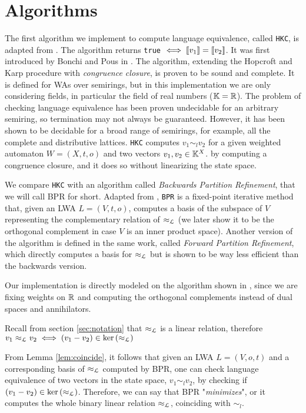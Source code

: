 \section{Algorithms}
The first algorithm we implement to compute language equivalence, called \texttt{HKC},
is adapted from \cite{DBLP:journals/corr/Bonchi0K17}. 
The algorithm returns \texttt{true} $\iff \llbracket v_1\rrbracket = \llbracket v_2\rrbracket$.
It was first introduced by 
Bonchi and Pous in \cite{bonchi2013checking}.
The algorithm, extending the Hopcroft and Karp procedure 
\cite{hopcroft1971linear} with \textit{congruence closure}, is 
proven to be sound and complete.
It is defined for 
WAs over semirings, but in this implementation we are only 
considering fields, in particular 
the field of real numbers ($\mathbb{K} = \mathbb{R}$).
The problem of checking language equivalence 
has been proven undecidable for an arbitrary semiring, so termination 
may not always be guaranteed. However, it has been shown to be decidable
for a broad range of semirings, for example, all the complete and
distributive lattices.
\texttt{HKC} computes $v_1 \sim_l v_2$ for a given weighted automaton
$W = (X, t, o)$ and two vectors $v_1, v_2 \in \mathbb{K}^X$. 
by computing a congruence closure,
and it does so without linearizing the state space. 

We compare \texttt{HKC} with an algorithm called 
\textit{Backwards Partition Refinement}, that we will call BPR for short. 
Adapted from \cite{BONCHI201277}, 
\texttt{BPR}
is a fixed-point iterative method that, given an LWA
$L = (V, t, o)$, computes a basis of the subspace of $V$
representing the complementary relation of $\approx_{\mathcal{L}}$ (we later show it to be the 
orthogonal complement in case $V$ is an inner product space). 
Another version of the algorithm is defined in the same work,
called \textit{Forward Partition Refinement}, which directly computes
a basis for $\approx_{\mathcal{L}}$ but is shown to be way less efficient than the backwards version.

Our implementation is directly modeled on the algorithm shown in 
\cite{boreale2009weighted}, since we are fixing weights on $\mathbb{R}$ and computing the orthogonal complements instead of 
dual spaces and annihilators. 

\begin{note}
  Recall from section \ref{sec:notation} that $\approx_{\mathcal{L}}$ is a linear relation, 
  therefore $v_1 \approx_{\mathcal{L}} v_2 \iff (v_1 - v_2) \in \text{ker}\left(\approx_{\mathcal{L}}\right)$
\end{note}


From Lemma \ref{lem:coincide}, it follows that given an LWA $L = (V,o,t)$ and a corresponding
basis of $\approx_{\mathcal{L}}$ computed by BPR, one can check language equivalence 
of two vectors in the state space, $v_1 \sim_l v_2 $,  by checking if $(v_1 - v_2) \in \text{ker}\left(\approx_{\mathcal{L}}\right)$.
Therefore, we can say that BPR "\textit{minimizes}", or it computes the whole
binary linear relation $\approx_{\mathcal{L}}$, coinciding with $\sim_l$.



